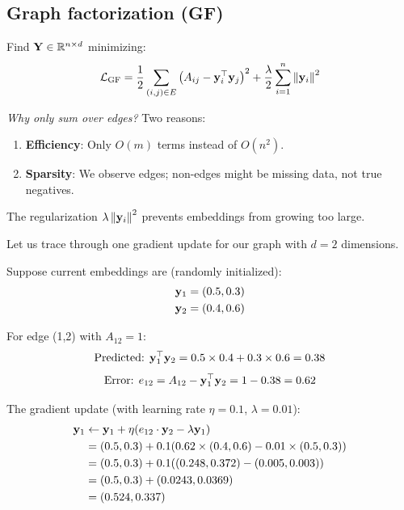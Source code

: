 \begin{notechapter}
\subsection{Graph factorization (GF)}

\begin{definition}
Find $\mathbf{Y} \in \mathbb{R}^{n \times d}$ minimizing:
\[
\mathcal{L}_{\text{GF}} = \frac{1}{2} \sum_{(i,j) \in E} \left(A_{ij} - \mathbf{y}_i^\top \mathbf{y}_j\right)^2 + \frac{\lambda}{2} \sum_{i=1}^{n} \left\|\mathbf{y}_i\right\|^2
\]
\end{definition}

\begin{intuition}
\emph{Why only sum over edges?} Two reasons:
\begin{enumerate}
    \item \textbf{Efficiency}: Only $O(m)$ terms instead of $O(n^2)$.
    \item \textbf{Sparsity}: We observe edges; non-edges might be missing data, not true negatives.
\end{enumerate}
The regularization $\lambda \left\|\mathbf{y}_i\right\|^2$ prevents embeddings from growing too large.
\end{intuition}

\begin{example}
Let us trace through one gradient update for our graph with $d=2$ dimensions.

Suppose current embeddings are (randomly initialized):
\begin{align*}
\mathbf{y}_1 &= (0.5, 0.3) \\
\mathbf{y}_2 &= (0.4, 0.6)
\end{align*}

For edge (1,2) with $A_{12} = 1$:
\[
\text{Predicted: } \mathbf{y}_1^\top \mathbf{y}_2 = 0.5 \times 0.4 + 0.3 \times 0.6 = 0.38
\]
\[
\text{Error: } e_{12} = A_{12} - \mathbf{y}_1^\top \mathbf{y}_2 = 1 - 0.38 = 0.62
\]

The gradient update (with learning rate $\eta = 0.1$, $\lambda = 0.01$):
\begin{align*}
\mathbf{y}_1 &\leftarrow \mathbf{y}_1 + \eta(e_{12} \cdot \mathbf{y}_2 - \lambda \mathbf{y}_1) \\
&= (0.5, 0.3) + 0.1(0.62 \times (0.4, 0.6) - 0.01 \times (0.5, 0.3)) \\
&= (0.5, 0.3) + 0.1((0.248, 0.372) - (0.005, 0.003)) \\
&= (0.5, 0.3) + (0.0243, 0.0369) \\
&= (0.524, 0.337)
\end{align*}


\end{example}
\end{notechapter}
